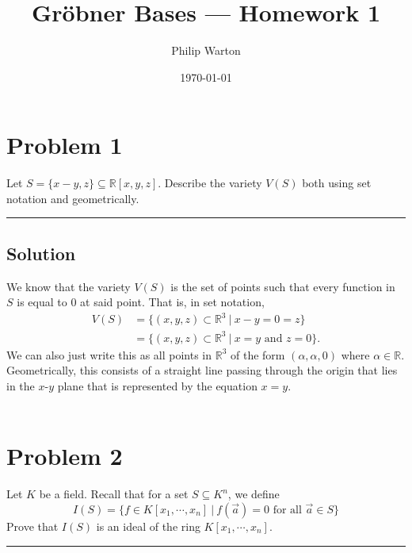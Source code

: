 \documentclass{article}
\theoremstyle{definition}
\begin{document}
\title{Gr{\"o}bner Bases --- Homework 1}
\author{Philip Warton}
\date{\today}
\maketitle

\section*{Problem 1}
Let $S = \{x - y, z \} \subseteq \mathbb{R}[x,y,z]$. Describe the variety $V(S)$ both using set notation and geometrically.
\\
\par\noindent\rule{\textwidth}{0.4pt}
\subsection*{Solution}
We know that the variety $V(S)$ is the set of points such that every function in $S$ is equal to 0 at said point.
That is, in set notation,
\begin{align*}
    V(S) &= \{(x,y,z) \subset \mathbb{R}^3 \ | \ x - y = 0 = z \} \\
    &= \{(x,y,z) \subset \mathbb{R}^3 \ | \ x = y \text{ and } z = 0\}.
\end{align*}
We can also just write this as all points in $\mathbb{R}^3$ of the form $(\alpha, \alpha, 0)$ where $\alpha \in \mathbb{R}$.
Geometrically, this consists of a straight line passing through the origin that lies in the $x$-$y$ plane 
that is represented by the equation $x = y$.
\\\\
\section*{Problem 2}
Let $K$ be a field. Recall that for a set $S \subseteq K^n$, we define
\[
    I(S) = \{f \in K[x_1, \cdots, x_n] \ | \ f(\vec a) = 0 \text{ for all } \vec a \in S\}
\]
Prove that $I(S)$ is an ideal of the ring $K[x_1, \cdots, x_n]$.
\\
\par\noindent\rule{\textwidth}{0.4pt}
\end{document}
